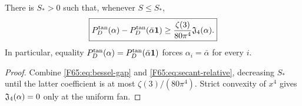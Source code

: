 \begin{theorem}\label{F65:thm:exact-disk}
There is $S_*>0$ such that, whenever $S\le S_*$,
\begin{equation}\label{F65:eq:exact-disk-gap}
 \boxed{
 P_D^{\rm tan}(\alpha)-P_D^{\rm tan}(\bar\alpha\mathbf1)
 \ge\frac{\zeta(3)}{80\pi^4}\mathfrak J_4(\alpha).}
\end{equation}
In particular, equality
$P_D^{\rm tan}(\alpha)=P_D^{\rm tan}(\bar\alpha\mathbf1)$ forces
$\alpha_i=\bar\alpha$ for every $i$.
\end{theorem}

\begin{proof}
Combine \eqref{F65:eq:bessel-gap} and \eqref{F65:eq:secant-relative}, decreasing
$S_*$ until the latter coefficient is at most
$\zeta(3)/(80\pi^4)$.  Strict convexity of $x^4$ gives
$\mathfrak J_4(\alpha)=0$ only at the uniform fan.
\end{proof}
\endgroup
